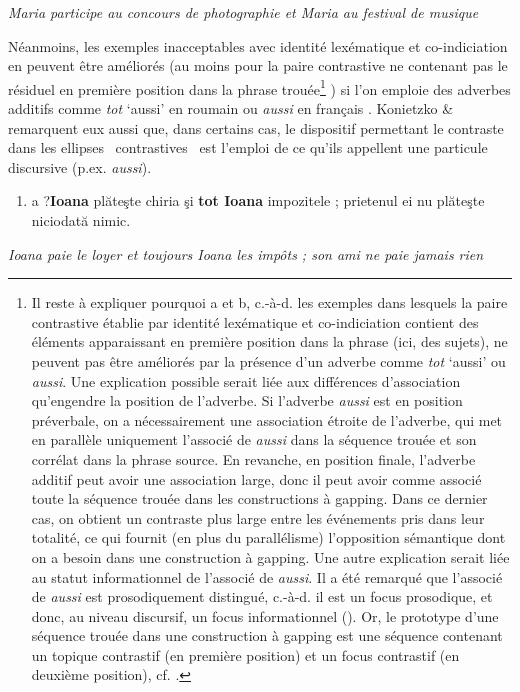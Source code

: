     \textit{Maria participe au concours de photographie et Maria au festival de musique}

Néanmoins, les exemples inacceptables avec identité lexématique et co-indiciation en  peuvent être améliorés (au moins pour la paire contrastive ne contenant pas le résiduel en première position dans la phrase trouée\footnote{Il reste à expliquer pourquoi a et b, c.-à-d. les exemples dans lesquels la paire contrastive établie par identité lexématique et co-indiciation contient des éléments apparaissant en première position dans la phrase (ici, des sujets), ne peuvent pas être améliorés par la présence d'un adverbe comme \textit{tot} `aussi' ou \textit{aussi}. Une explication possible serait liée aux différences d'association qu'engendre la position de l'adverbe. Si l'adverbe \textit{aussi} est en position préverbale, on a nécessairement une association étroite de l'adverbe, qui met en parallèle uniquement l'associé de \textit{aussi} dans la séquence trouée et son corrélat dans la phrase source. En revanche, en position finale, l'adverbe additif peut avoir une association large, donc il peut avoir comme associé toute la séquence trouée dans les constructions à gapping. Dans ce dernier cas, on obtient un contraste plus large entre les événements pris dans leur totalité, ce qui fournit (en plus du parallélisme) l'opposition sémantique dont on a besoin dans une construction à gapping. Une autre explication serait liée au statut informationnel de l'associé de \textit{aussi}. Il a été remarqué que l'associé de \textit{aussi} est prosodiquement distingué, c.-à-d. il est un focus prosodique, et donc, au niveau discursif, un focus informationnel (\citet{Jackendoff1972}). Or, le prototype d'une séquence trouée dans une construction à gapping est une séquence contenant un topique contrastif (en première position) et un focus contrastif (en deuxième position), cf. \citet{Winkler2005}.} ) si l'on emploie des adverbes additifs comme \textit{tot} `aussi' en roumain  ou \textit{aussi} en français . Konietzko \& \citet{Winkler2010} remarquent eux aussi que, dans certains cas, le dispositif permettant le contraste dans les ellipses {\guillemotleft}~contrastives~{\guillemotright} est l'emploi de ce qu'ils appellent une particule discursive (p.ex. \textit{aussi}).


\begin{enumerate}
\item \label{bkm:Ref299633645}a  ?\textbf{Ioana} plăteşte chiria şi \textbf{tot Ioana} impozitele ; prietenul ei nu plăteşte niciodată nimic.


\end{enumerate}
{\itshape
Ioana paie le loyer et toujours Ioana les impôts ; son ami ne paie jamais rien } 

